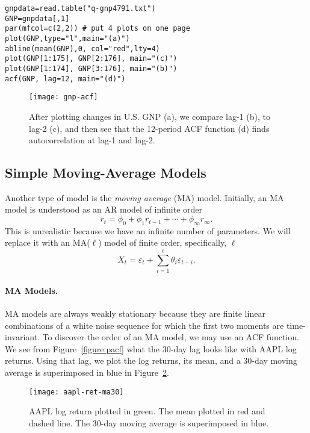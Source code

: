 \begin{verbatim}
gnpdata=read.table("q-gnp4791.txt")
GNP=gnpdata[,1]
par(mfcol=c(2,2)) # put 4 plots on one page
plot(GNP,type="l",main="(a)") 
abline(mean(GNP),0, col="red",lty=4)
plot(GNP[1:175], GNP[2:176], main="(c)")
plot(GNP[1:174], GNP[3:176], main="(b)")
acf(GNP, lag=12, main="(d)") 

\end{verbatim}

\begin{figure}[tb]
  \centering
  \texttt{[image: gnp-acf]}
  \caption[Analysis of U.S. GNP with ACF function]{After plotting changes in U.S. GNP (a), we compare lag-1 (b), to lag-2 (c), and then see that the 12-period ACF function (d) finds autocorrelation at lag-1 and lag-2.}
  \label{figure:gnp-acf}
\end{figure}

\subsection{Simple Moving-Average Models}
Another type of \fts{} model is the \emph{moving average} (MA) model. Initially, an MA model is understood as an AR model of infinite order
\[
r_t = \phi_0 + \phi_1 r_{t-1} + \cdots + \phi_{\infty} r_{\infty}.
\]
This is unrealistic because we have an infinite number of parameters. We will replace it with an MA($\ell$) model of finite order, specifically, $\ell$
\[
X_t = \varepsilon_t + \sum_{i=1}^\ell \theta_i \varepsilon_{t-i}.
\]

\paragraph{MA Models.} MA models are always weakly stationary because they are finite linear combinations of a white noise sequence for which the first two moments are time-invariant. To discover the order of an MA model, we may use an ACF function. We see from Figure~\ref{figure:pacf} what the 30-day lag looks like with AAPL log returns. Using that lag, we plot the log returns, its mean, and a 30-day moving average is superimposed in blue in Figure~\ref{figure:aapl-ret-ma30}.

\begin{figure}[tb]
  \centering
  \texttt{[image: aapl-ret-ma30]}
  \caption[AAPL Log Returns and MA(30)]{AAPL log return plotted in green. The mean plotted in red and dashed line. The 30-day moving average is superimposed in blue.}
  \label{figure:aapl-ret-ma30}
\end{figure}


